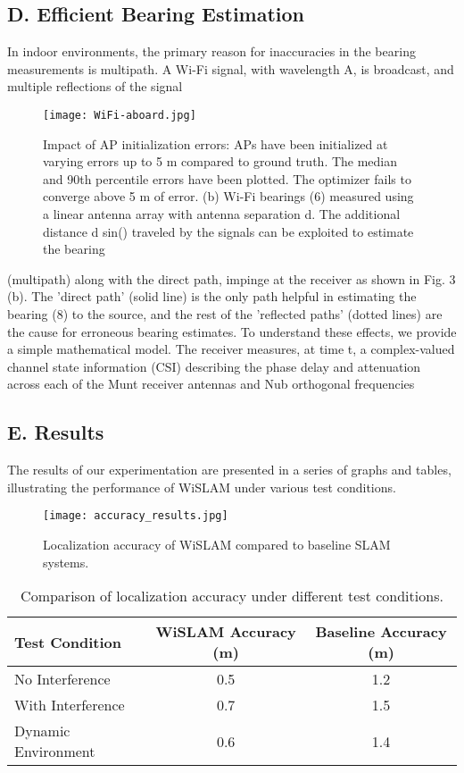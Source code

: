\documentclass[
	a4paper, %
	11pt, %
	unnumberedsections, %
	twoside, %
]{LTJournalArticle}
\begin{document}
\subsection{D.	Efficient Bearing Estimation}
In indoor environments, the primary reason for inaccuracies in the bearing measurements is multipath. A Wi-Fi signal, with wavelength A, is broadcast, and multiple reflections of the signal

\begin{figure}[h]
    \centering
    \texttt{[image: WiFi-aboard.jpg]}
    \caption{Impact of AP initialization errors: APs have been initialized at varying errors up to 5 m compared to ground truth. The median and 90th percentile errors have been plotted. The optimizer fails to converge above 5 m of error. (b) Wi-Fi bearings (6) measured using a linear antenna array with antenna separation d. The additional distance d sin() traveled by the signals can be exploited to estimate the bearing}
    \label{fig:WiFi-aboard}
\end{figure}

(multipath) along with the direct path, impinge at the receiver as shown in Fig. 3 (b). The 'direct path' (solid line) is the only path helpful in estimating the bearing (8) to the source, and the rest of the 'reflected paths' (dotted lines) are the cause for erroneous bearing estimates.
To understand these effects, we provide a simple mathematical model. The receiver measures, at time t, a complex-valued channel state information (CSI) describing the phase delay and attenuation across each of the Munt receiver antennas and Nub orthogonal frequencies 

\subsection{E.	Results}
The results of our experimentation are presented in a series of graphs and tables, illustrating the performance of WiSLAM under various test conditions.

\begin{figure*}[ht]
	\centering
	\texttt{[image: accuracy\_results.jpg]}
	\caption{Localization accuracy of WiSLAM compared to baseline SLAM systems.}
	\label{fig:accuracy_results}
\end{figure*}

\begin{table*}[ht]
	\centering
	\begin{tabular}{lcc}
		\toprule
		Test Condition & WiSLAM Accuracy (m) & Baseline Accuracy (m) \\
		\midrule
		No Interference & 0.5 & 1.2 \\
		With Interference & 0.7 & 1.5 \\
		Dynamic Environment & 0.6 & 1.4 \\
		\bottomrule
	\end{tabular}
	\caption{Comparison of localization accuracy under different test conditions.}
	\label{tab:accuracy_comparison}
\end{table*}
\end{document}

